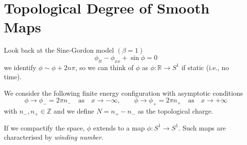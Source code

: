 \documentclass[a4paper,11pt]{article}
\begin{document}
    \section{Topological Degree of Smooth Maps}
    Look back at the Sine-Gordon model $(\beta = 1)$ 
    \begin{equation}
        \phi_{tt} - \phi_{xx} + \sin \phi = 0
    \end{equation}
    we identify $\phi \sim \phi + 2 n \pi$, so we can think of $\phi$ as $\phi: \mathbb{R} \to S^1$ if static (i.e., no time).

    We consider the following finite energy configuration with asymptotic conditions 
    \begin{equation}
        \phi \to \phi_- = 2 \pi n_- \quad \text{as} \quad x \to -\infty, \qquad \phi \to \phi_+ = 2 \pi n_+ \quad \text{as} \quad x \to +\infty
    \end{equation}
    with $n_-, n_+ \in \mathbb{Z}$ and we define $N = n_+ - n_-$ as the topological charge. 

    If we compactify the space, $\phi$ extends to a map $\phi: S^1 \to S^1$. Such maps are characterised by \emph{winding number}.
\end{document}
